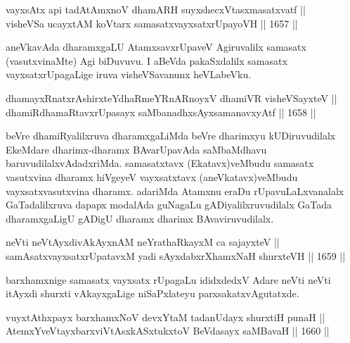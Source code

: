 \begin{shl}
vayxsAtx api tadAtAmxnoV dhamARH suyxshecxVtasxmasatxvatf || \\
visheVSa ucayxtAM koV\s tarx samasatxvayxsatxrUpayoVH \hfill || 1657 ||  
\end{shl}

\begin{artha}
aneVkavAda dharamxgaLU AtamxsavxrUpaveV Agiruvalilx samasatx (vasutxvinaMte) Agi biDuvuvu. I aBeVda pakaSxdalilx samasatx vayxsatxrUpagaLige iruva visheVSavanunx heVLabeVku.
\end{artha}


\begin{shl}
dhamayxRnatxrAshirxteYdhaRmeYRnARnoyxV dhamiVR visheVSayxteV || \\
dhamiRdhamaRtavxrUpasayx saMbanadhxsAyxsamanavxyAtf \hfill || 1658 ||  
\end{shl}

\begin{artha}
beVre dhamiRyalilxruva dharamxgaLiMda beVre dharimxyu kUDiruvudilalx EkeMdare dharimx-dharamx BAvarUpavAda saMbaMdhavu baruvudilalxvAdadxriMda. samasatxtavx (Ekatavx)veMbudu samasatx vasutxvina dharamx hiVgeyeV vayxsatxtavx (aneVkatavx)veMbudu vayxsatxvasutxvina dharamx. adariMda Atamxnu eraDu rUpavuLaLxvanalalx GaTadalilxruva dapapx modalAda guNagaLu gADiyalilxruvudilalx GaTada dharamxgaLigU gADigU dharamx dharimx BAvaviruvudilalx.
\end{artha}


\begin{shl}
neVti neVtAyxdivAkAyxnAM neYrathaRkayxM ca sajayxteV || \\
samAsatxvayxsatxrUpatavxM yadi sAyxdabxrXhamxNaH shurxteVH \hfill || 1659 ||  
\end{shl}

\begin{artha}
barxhamxnige samasatx vayxsatx rUpagaLu ididxdedxV Adare neVti neVti itAyxdi shurxti vAkayxgaLige niSaPxlateyu parxsakatxvAgutatxde.
\end{artha}


\begin{shl}
vuyxtAthxpayx barxhamxNoV devxYtaM tadanUdayx shurxtiH punaH || \\
AtemxYveVtayxbarxviVtAsxkASxtukxtoV BeVdasayx saMBavaH \hfill || 1660 ||  
\end{shl}

